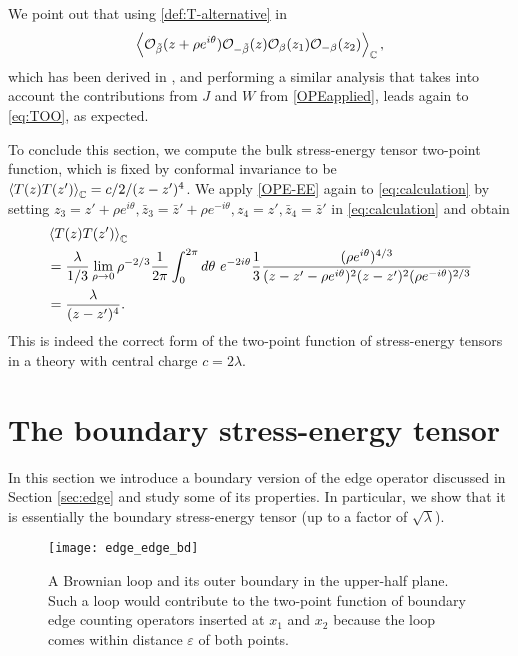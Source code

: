 \documentclass[a4paper,11pt]{article}
\begin{document}
We point out that using \eqref{def:T-alternative} in
\begin{align}
    \Braket{\mathcal{O}_{\tilde\beta}(z+\rho e^{i\theta}) \mathcal{O}_{-\tilde\beta}(z) \mathcal{O}_{\beta}(z_1) \mathcal{O}_{-\beta}(z_2)}_{\mathbb{C}},
\end{align}
which has been derived in \cite{Camia_2020}, and performing a similar analysis that takes into account the contributions from $J$ and $W$ from \eqref{OPEapplied}, leads again to \eqref{eq:TOO}, as expected. 

To conclude this section, we compute the bulk stress-energy tensor two-point function, which is fixed by conformal invariance to be $\Braket{T(z)T(z')}_\mathbb{C} = c/2/(z-z')^4$. We apply \eqref{OPE-EE} again to \eqref{eq:calculation} by setting $z_3 = z' + \rho e^{i \theta}, \bar{z}_3 = \bar{z}' + \rho e^{-i \theta}, z_4 = z', \bar{z}_4 = \bar{z}'$ in \eqref{eq:calculation} and obtain
\begin{align}
\begin{split}
    &\Braket{T(z)T(z')}_\mathbb{C} \\
    &= \frac{\lambda}{1/3} \lim_{\rho \to 0} \rho^{-2/3} \frac{1}{2 \pi} \int_0^{2\pi} d \theta ~ e^{-2 i \theta} \frac{1}{3} \frac{(\rho e^{i \theta})^{4/3}}{(z-z'-\rho e^{i\theta})^2 (z-z')^2 (\rho e^{-i\theta})^{2/3}} \\
    &= \frac{\lambda}{(z-z')^4}.
\end{split}
\end{align}
This is indeed the correct form of the two-point function of stress-energy tensors in a theory with central charge $c = 2 \lambda$.


\section{The boundary stress-energy tensor} \label{sec:boundary-edge}

In this section we introduce a boundary version of the edge operator discussed in Section \ref{sec:edge} and study some of its properties. In particular, we show that it is essentially the boundary stress-energy tensor (up to a factor of $\sqrt{\lambda}$).

\begin{figure}[t]
    \centering
    \texttt{[image: edge\_edge\_bd]}
    \caption{A Brownian loop and its outer boundary in the upper-half plane. Such a loop would contribute to the two-point function of boundary edge counting operators inserted at $x_{1}$ and $x_2$ because the loop comes within distance $\varepsilon$ of both points.}
    \label{edge_edge}
\end{figure}
\end{document}

